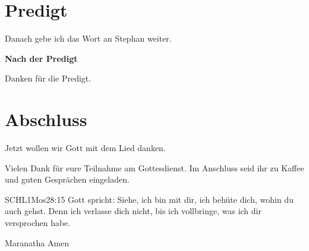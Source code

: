 \documentclass{../../inc/mybib}
\begin{document}
\section{Predigt}

Danach gebe ich das Wort an Stephan weiter.

\textbf{Nach der Predigt}

Danken für die Predigt.






\section{Abschluss}

Jetzt wollen wir Gott mit dem Lied  danken.

Vielen Dank für eure Teilnahme am Gottesdienst. Im Anschluss seid ihr zu Kaffee und guten Gesprächen eingeladen.
\beten{}

\begin{bibelbox}{SCHL}{1Mos}{28:15}
Gott spricht: Siehe, ich bin mit dir,
ich behüte dich, wohin du auch gehst.
Denn ich verlasse dich nicht,
bis ich vollbringe, was ich dir versprochen habe.
\end{bibelbox}

Maranatha Amen
\end{document}

